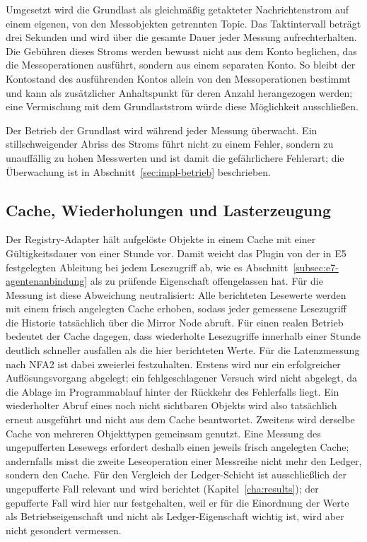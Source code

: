 Umgesetzt wird die Grundlast als gleichmäßig getakteter Nachrichtenstrom auf einem eigenen, von den Messobjekten getrennten Topic. Das Taktintervall beträgt drei Sekunden und wird über die gesamte Dauer jeder Messung aufrechterhalten. Die Gebühren dieses Stroms werden bewusst nicht aus dem Konto beglichen, das die Messoperationen ausführt, sondern aus einem separaten Konto. So bleibt der Kontostand des ausführenden Kontos allein von den Messoperationen bestimmt und kann als zusätzlicher Anhaltspunkt für deren Anzahl herangezogen werden; eine Vermischung mit dem Grundlaststrom würde diese Möglichkeit ausschließen.

Der Betrieb der Grundlast wird während jeder Messung überwacht. Ein stillschweigender Abriss des Stroms führt nicht zu einem Fehler, sondern zu unauffällig zu hohen Messwerten und ist damit die gefährlichere Fehlerart; die Überwachung ist in Abschnitt~\ref{sec:impl-betrieb} beschrieben.


\subsection{Cache, Wiederholungen und Lasterzeugung}
\label{subsec:impl-wiederholungen}

Der Registry-Adapter hält aufgelöste Objekte in einem Cache mit einer Gültigkeitsdauer von einer Stunde vor. Damit weicht das Plugin von der in E5 festgelegten Ableitung bei jedem Lesezugriff ab, wie es Abschnitt~\ref{subsec:e7-agentenanbindung} als zu prüfende Eigenschaft offengelassen hat. Für die Messung ist diese Abweichung neutralisiert: Alle berichteten Lesewerte werden mit einem frisch angelegten Cache erhoben, sodass jeder gemessene Lesezugriff die Historie tatsächlich über die Mirror Node abruft. Für einen realen Betrieb bedeutet der Cache dagegen, dass wiederholte Lesezugriffe innerhalb einer Stunde deutlich schneller ausfallen als die hier berichteten Werte. Für die Latenzmessung nach NFA2 ist dabei zweierlei festzuhalten. Erstens wird nur ein erfolgreicher Auflösungsvorgang abgelegt; ein fehlgeschlagener Versuch wird nicht abgelegt, da die Ablage im Programmablauf hinter der Rückkehr des Fehlerfalls liegt. Ein wiederholter Abruf eines noch nicht sichtbaren Objekts wird also tatsächlich erneut ausgeführt und nicht aus dem Cache beantwortet. Zweitens wird derselbe Cache von mehreren Objekttypen gemeinsam genutzt. Eine Messung des ungepufferten Lesewegs erfordert deshalb einen jeweils frisch angelegten Cache; andernfalls misst die zweite Leseoperation einer Messreihe nicht mehr den Ledger, sondern den Cache. Für den Vergleich der Ledger-Schicht ist ausschließlich der ungepufferte Fall relevant und wird berichtet (Kapitel~\ref{cha:results}); der gepufferte Fall wird hier nur festgehalten, weil er für die Einordnung der Werte als Betriebseigenschaft und nicht als Ledger-Eigenschaft wichtig ist, wird aber nicht gesondert vermessen.

